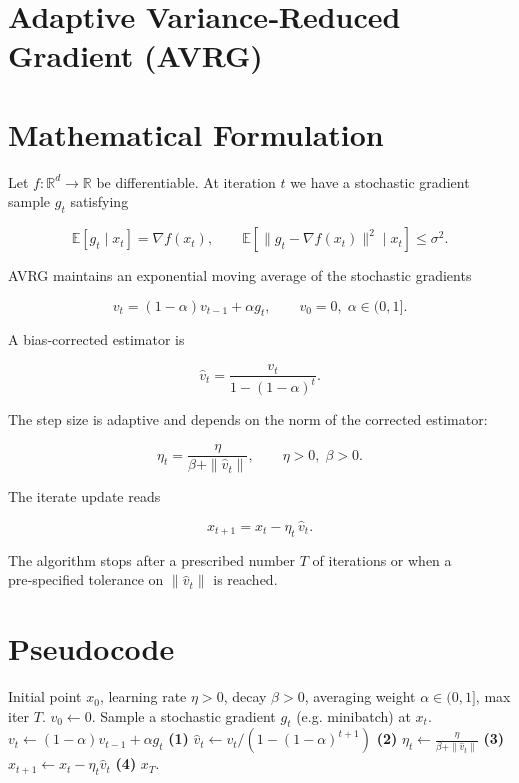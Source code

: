 \documentclass{article}
\newcommand{\E}{\mathbb{E}}
\begin{document}
\section*{Adaptive Variance‑Reduced Gradient (AVRG)}

\section*{Mathematical Formulation}
Let $f:\mathbb{R}^d\rightarrow\mathbb{R}$ be differentiable.  
At iteration $t$ we have a stochastic gradient sample $g_t$ satisfying  

\[
\E[g_t\mid x_t]=\nabla f(x_t),\qquad 
\E\!\left[\|g_t-\nabla f(x_t)\|^{2}\mid x_t\right]\le\sigma^{2}.
\]

AVRG maintains an exponential moving average of the stochastic gradients  

\[
\boxed{v_t =(1-\alpha)v_{t-1}+\alpha g_t},\qquad v_{0}=0,\;\alpha\in(0,1].
\tag{1}
\]

A bias‑corrected estimator is  

\[
\boxed{\hat v_t = \frac{v_t}{1-(1-\alpha)^{t}}}.
\tag{2}
\]

The step size is adaptive and depends on the norm of the corrected estimator:  

\[
\boxed{\eta_t = \frac{\eta}{\beta+\|\hat v_t\|}},\qquad \eta>0,\;\beta>0.
\tag{3}
\]

The iterate update reads  

\[
\boxed{x_{t+1}=x_t-\eta_t \,\hat v_t}.
\tag{4}
\]

The algorithm stops after a prescribed number $T$ of iterations or when a
pre‑specified tolerance on $\|\hat v_t\|$ is reached.

\section*{Pseudocode}
\begin{algorithm}[H]
\caption{Adaptive Variance‑Reduced Gradient (AVRG)}
\begin{algorithmic}[1]
\Require Initial point $x_0$, learning rate $\eta>0$, decay $\beta>0$, averaging weight $\alpha\in(0,1]$, max iter $T$.
\State $v_{0}\gets 0$.
    \State Sample a stochastic gradient $g_t$ (e.g. minibatch) at $x_t$.
    \State $v_t \gets (1-\alpha)v_{t-1}+\alpha g_t$ \hfill\textbf{(1)}
    \State $\hat v_t \gets v_t/(1-(1-\alpha)^{t+1})$ \hfill\textbf{(2)}
    \State $\eta_t \gets \displaystyle\frac{\eta}{\beta+\|\hat v_t\|}$ \hfill\textbf{(3)}
    \State $x_{t+1} \gets x_t-\eta_t\hat v_t$ \hfill\textbf{(4)}
\EndFor
\State \Return $x_T$.
\end{algorithmic}
\end{algorithm}
\end{document}
